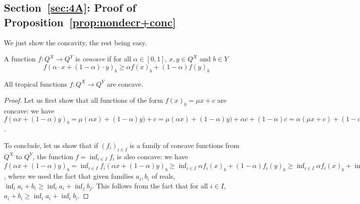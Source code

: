 \subsection{Section~\ref{sec:4A}: Proof of Proposition~\ref{prop:nondecr+conc}}

We just show the concavity, the rest being easy.

A function $f:Q^{X}\to Q^{Y}$ is \emph{concave} if for all $\alpha\in [0,1]$, $ x ,  y  \in Q^{X}$ and $b\in Y$ 
$$
f(\alpha\cdot  x +(1-\alpha)\cdot  y  )_{b} \geq \alpha f( x )_{b} + (1-\alpha)f( y  )_{b}
$$



\begin{proposition}
All tropical functions $f: Q^{X}\to Q^{Y}$ are concave.
\end{proposition}
\begin{proof}
Let us first show that all functions of the form $f( x )_{b}= \mu  x + c$ are concave:
we have $f(\alpha x + (1-\alpha) y  )_{b}= \mu(\alpha x )+(1-\alpha) y  )+c=
 \mu(\alpha x )+(1-\alpha) y  )+\alpha c+(1-\alpha)c=
 \alpha(\mu  x  + c)+(1-\alpha)(\mu  y  +c)=\alpha f( x )_{b}+(1-\alpha) f( x )_{b}$.


To conclude, let us show that if $(f_{i})_{i\in I}$ is a family of concave functions from $Q^{X}$ to $Q^{Y}$, the function $f=\inf_{i\in I}f_{i}$ is also concave: we have
$f(\alpha x  +(1-\alpha) y  )_{b}=
\inf_{i\in I}f_{i}(\alpha x +(1-\alpha) y  )_{b} \geq 
\inf_{i\in I}\alpha f_{i}( x )_{b}+(1-\alpha)f_{i}( y  )_{b}
\geq 
\inf_{i\in I}\alpha f_{i}( x )_{b} + \inf_{j\in I}(1-\alpha)f_{j}( y  )_{b}
=
\alpha \cdot (\inf_{i\in I}f_{i}( x )_{b})+ (1-\alpha)\cdot( \inf_{j\in I}f_{j}( y  )_{b})=
\alpha  f( x )_{b}+(1-\alpha)f( y  )_{b}$, where we used the fact that given families $a_{i},b_{i}$ of reals,
$\inf_{i}a_{i}+b_{i}\geq \inf_{i}a_{i}+\inf_{j}b_{j}$.
This follows from the fact that for all $i\in I$, $a_{i}+b_{i}\geq \inf_{i}a_{i}+\inf_{i}b_{i}$.
\end{proof}

